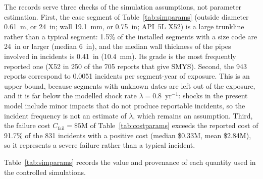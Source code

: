 \documentclass[journal]{IEEEtran}
\begin{document}
The records serve three checks of the simulation assumptions, not
parameter estimation. First, the case segment of
Table~\ref{tab:simparams} (outside diameter 0.61~m, or 24~in; wall
19.1~mm, or 0.75~in; API~5L X52) is a large trunkline rather than a
typical segment: 1.5\% of the installed segments with a size code
are 24~in or larger (median 6~in), and the median wall thickness
of the pipes involved in incidents is 0.41~in (10.4~mm). Its
grade is the most frequently reported one (X52 in 250 of the 705
reports that give SMYS). Second, the 943 reports correspond to
0.0051 incidents per segment-year of exposure. This is an upper bound,
because segments with unknown dates are left out of the exposure, and
it is far below the modelled shock rate $\lambda=0.8$~yr$^{-1}$: shocks
in the present model include minor impacts that do not produce
reportable incidents, so the incident frequency is not an estimate of
$\lambda$, which remains an assumption. Third, the failure cost
$C_{\mathrm{fail}}=\$5$M of Table~\ref{tab:costparams} exceeds the
reported cost of 91.7\% of the 831 incidents with a positive cost
(median \$0.33M, mean \$2.84M), so it represents a severe failure
rather than a typical incident.

Table~\ref{tab:simparams} records the value and provenance of each
quantity used in the controlled simulations.
\end{document}
